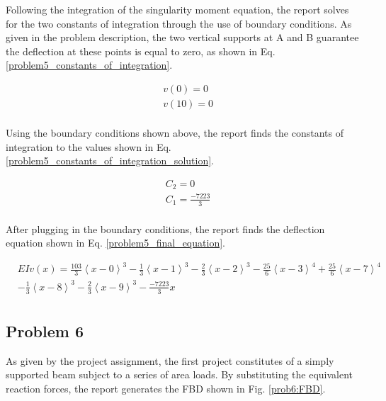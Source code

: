 \documentclass[a4paper]{article}
\begin{document}
Following the integration of the singularity moment equation, the report solves for the two constants of integration through the use of boundary conditions. As given in the problem description, the two vertical supports at A and B guarantee the deflection at these points is equal to zero, as shown in Eq. \ref{problem5_constants_of_integration}.

\begin{equation}
\begin{split}
	& v(0) = 0 \\
	& v(10) = 0 \\
\end{split}
\label{problem5_constants_of_integration}
\end{equation}

Using the boundary conditions shown above, the report finds the constants of integration to the values shown in Eq. \ref{problem5_constants_of_integration_solution}.

\begin{equation}
\begin{split}
	& C_2 = 0 \\
	& C_1 = \frac{-7223}{3} \\
\end{split}
\label{problem5_constants_of_integration_solution}
\end{equation}

After plugging in the boundary conditions, the report finds the deflection equation shown in Eq. \ref{problem5_final_equation}.

\begin{equation}
\begin{split}
  & EI v(x) = \frac{103}{3}\left<x-0\right>^3 - \frac{1}{3}\left<x-1\right>^3 -  \frac{2}{3}\left<x-2\right>^3 - \frac{25}{6}\left<x-3\right>^4 + \frac{25}{6}\left<x-7\right>^4 \\
& - \frac{1}{3}\left<x-8\right>^3 -  \frac{2}{3}\left<x-9\right>^3 - \frac{-7223}{3}x\\
\end{split}
\label{problem5_final_equation}
\end{equation}



\subsection{Problem 6}

As given by the project assignment, the first project constitutes of a simply supported beam subject to a series of area loads. By substituting the equivalent reaction forces, the report generates the FBD shown in Fig. \ref{prob6:FBD}.
\end{document}
